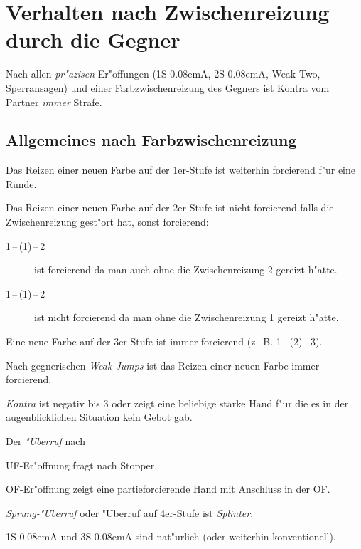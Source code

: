 \documentclass[11pt,german,twocolumn,twoside]{scrartcl}
\def\sa{\nobreak\textsf{S\kern-0.08emA}\xspace}
\def\ofa{\nobreak\textsf{OF}\xspace}
\def\ufa{\nobreak\textsf{UF}\xspace}
\def\pik{\nobreak\hspace{\cardskip}\Sp\xspace}
\def\coe{\nobreak\hspace{\cardskip}\He\xspace}
\def\kar{\nobreak\hspace{\cardskip}\Di\xspace}
\def\tre{\nobreak\hspace{\cardskip}\Cl\xspace}
\def\SA{\nobreak\hspace{\cardskip}\sa}
\def\sep{\,--\,}
\newcommand{\conv}[1]{\emph{#1}}
\begin{document}
\newpage

\section{Verhalten nach Zwischenreizung durch die
  Gegner\label{zwischenreizung}}

Nach allen \emph{pr"azisen} Er"offungen (1\SA, 2\SA, Weak Two, Sperransagen)
und einer Farbzwischenreizung des Gegners ist Kontra vom Partner \emph{immer}
Strafe.

\subsection{Allgemeines nach Farbzwischenreizung}
\begin{compactitem}
\item Das Reizen einer neuen Farbe auf der 1er-Stufe ist weiterhin
forcierend f"ur eine Runde.
%
\item Das Reizen einer neuen Farbe auf der 2er-Stufe ist nicht forcierend
falls die Zwischenreizung gest"ort hat, sonst forcierend:
\begin{description}
\item[1\coe{}\sep(1\pik){}\sep2\kar] ist forcierend da man auch
ohne die Zwischenreizung 2\kar gereizt h"atte.
\item[1\tre{}\sep(1\pik){}\sep2\coe] ist nicht forcierend da man ohne die
  Zwischenreizung 1\coe gereizt h"atte.
\end{description}
%
\item Eine neue Farbe auf der 3er-Stufe ist immer forcierend
  (z.~B. 1\pik{}\sep(2\kar){}\sep3\tre).
\item Nach gegnerischen \conv{Weak Jumps} ist das Reizen einer neuen Farbe immer
  forcierend.
\item \conv{Kontra} ist negativ bis 3\coe oder zeigt eine beliebige
  starke Hand f"ur die es in der augenblicklichen Situation kein Gebot
  gab.
\item Der \conv{"Uberruf} nach
  \begin{compactitem}
    \item \ufa-Er"offnung fragt nach Stopper,
    \item \ofa-Er"offnung zeigt eine partieforcierende Hand mit
      Anschluss in der \ofa.
    \end{compactitem}
\item \conv{Sprung-"Uberruf} oder "Uberruf auf 4er-Stufe ist \conv{Splinter}.
\item 1\SA und 3\SA sind nat"urlich (oder weiterhin konventionell).
\end{compactitem}
\end{document}
